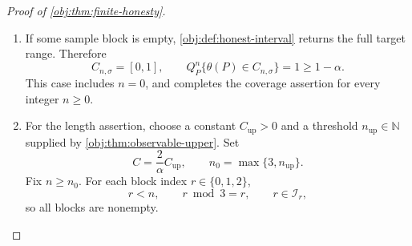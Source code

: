 \begin{proof}[Proof of \cref{obj:thm:finite-honesty}]
\begin{enumerate}
Define the measurable event
\[
\mathcal G_{\mathrm{cover}}
=
\left\{\text{data}:
|\widehat\theta-\theta(P)|\le A_{\widehat q}(K)/\alpha\right\}.
\]
Markov's inequality and the certificate give
\[
A_{\widehat q}(K)/\alpha\,
Q_P^n\!\left\{
A_{\widehat q}(K)/\alpha\le|\widehat\theta-\theta(P)|
\right\}
\le
E_{Q_P^n}|\widehat\theta-\theta(P)|
\le A_{\widehat q}(K).
\]
Because \(A_{\widehat q}(K)>0\) and \(\alpha>0\), and the complement of
\(\mathcal G_{\mathrm{cover}}\) is contained in the displayed upper-tail event,
\[
Q_P^n(\mathcal G_{\mathrm{cover}}^c)
\le
Q_P^n\!\left\{
A_{\widehat q}(K)/\alpha\le|\widehat\theta-\theta(P)|
\right\}
\le\alpha,
\qquad
Q_P^n(\mathcal G_{\mathrm{cover}})\ge1-\alpha.
\]
On \(\mathcal G_{\mathrm{cover}}\),
\[
\widehat\theta-A_{\widehat q}(K)/\alpha
\le\theta(P)
\le\widehat\theta+A_{\widehat q}(K)/\alpha.
\]
Combining these inequalities with the target range gives
\[
\max\!\left\{0,\widehat\theta-A_{\widehat q}(K)/\alpha\right\}
\le\theta(P)
\le
\min\!\left\{1,\widehat\theta+A_{\widehat q}(K)/\alpha\right\}.
\]
Thus \cref{obj:def:honest-interval} implies
\[
Q_P^n\{\theta(P)\in C_{n,\sigma}\}
\ge Q_P^n(\mathcal G_{\mathrm{cover}})
\ge1-\alpha.
\]

\item If some sample block is empty, \cref{obj:def:honest-interval} returns the full target range. Therefore
\[
C_{n,\sigma}=[0,1],
\qquad
Q_P^n\{\theta(P)\in C_{n,\sigma}\}=1\ge1-\alpha.
\]
This case includes \(n=0\), and completes the coverage assertion for every integer \(n\ge0\).

\item For the length assertion, choose a constant \(C_{\mathrm{up}}>0\) and a threshold \(n_{\mathrm{up}}\in\mathbb N\) supplied by \cref{obj:thm:observable-upper}. Set
\[
C=\frac{2}{\alpha}C_{\mathrm{up}},
\qquad
n_0=\max\{3,n_{\mathrm{up}}\}.
\]
Fix \(n\ge n_0\). For each block index \(r\in\{0,1,2\}\),
\[
r<n,\qquad r\bmod3=r,\qquad r\in\mathcal I_r,
\]
so all blocks are nonempty.


\end{enumerate}
\end{proof}
